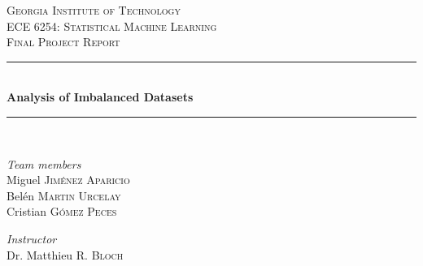 \documentclass[11pt]{article}
\begin{document}

\begin{titlepage} %
	\newcommand{\HRule}{\rule{\linewidth}{0.5mm}} %
	
	\center %
	
	
	\textsc{\LARGE Georgia Institute of Technology}\\[1.5cm] %
	
	\textsc{\Large ECE 6254: Statistical Machine Learning}\\[0.5cm] %
	
	\textsc{\large Final Project Report}\\[0.5cm] %
	
	
	\HRule\\[0.4cm]
	
	{\huge\bfseries Analysis of Imbalanced Datasets}\\[0.4cm] %
	
	\HRule\\[1.5cm]
	
	
	\begin{minipage}{0.4\textwidth}
		\begin{flushleft}
			\large
			\textit{Team members}\\
			Miguel \textsc{Jiménez Aparicio}\\ %
			Belén \textsc{Martin Urcelay}\\ %
			Cristian \textsc{Gómez Peces}\\ %
		\end{flushleft}
	\end{minipage}
	\hfill %
	\begin{minipage}{0.4\textwidth}
		\begin{flushleft}
			\large
			\textit{Instructor}\\
			Dr. Matthieu \textsc{R. Bloch}\\ %
			\textsc{ } \\
			\textsc{ }  \\
		\end{flushleft}
	\end{minipage}
	

\end{titlepage}
\end{document}

